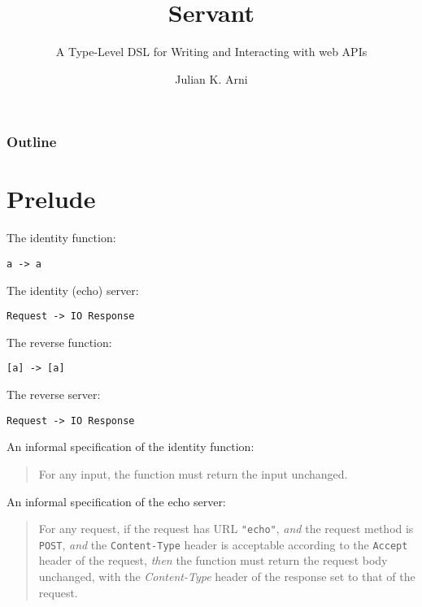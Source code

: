 \documentclass{beamer}
\title{Servant}
\subtitle{A Type-Level DSL for Writing and Interacting with web APIs}
\author{Julian K. Arni}
\begin{document}
\frame{\titlepage}

\begin{frame}
    \frametitle{Outline}
    \tableofcontents[]
\end{frame}

\section{Prelude} %
\begin{frame}[fragile]
    The identity function:
\begin{verbatim}
a -> a
\end{verbatim}
\end{frame}

\begin{frame}[fragile]
    The identity (echo) server:
\begin{verbatim}
Request -> IO Response
\end{verbatim}
\end{frame}

\begin{frame}[fragile]
    The reverse function:
\begin{verbatim}
[a] -> [a]
\end{verbatim}
\end{frame}

\begin{frame}[fragile]
    The reverse server:
\begin{verbatim}
Request -> IO Response
\end{verbatim}
\end{frame}

\begin{frame}[fragile]
    An informal specification of the identity function:
\begin{quotation}
    For any input, the function must return the input unchanged.
\end{quotation}
\end{frame}

\begin{frame}[fragile]
    An informal specification of the echo server:
\begin{quotation}
    For any request, if the request has URL \texttt{"echo"}, \textit{and} the
    request method is \texttt{POST}, \textit{and} the \texttt{Content-Type}
    header is acceptable according to the \texttt{Accept} header of the request,
    \textit{then} the function must return the request body unchanged, with the
    \textit{Content-Type} header of the response set to that of the request.
\end{quotation}
\end{frame}
\end{document}
